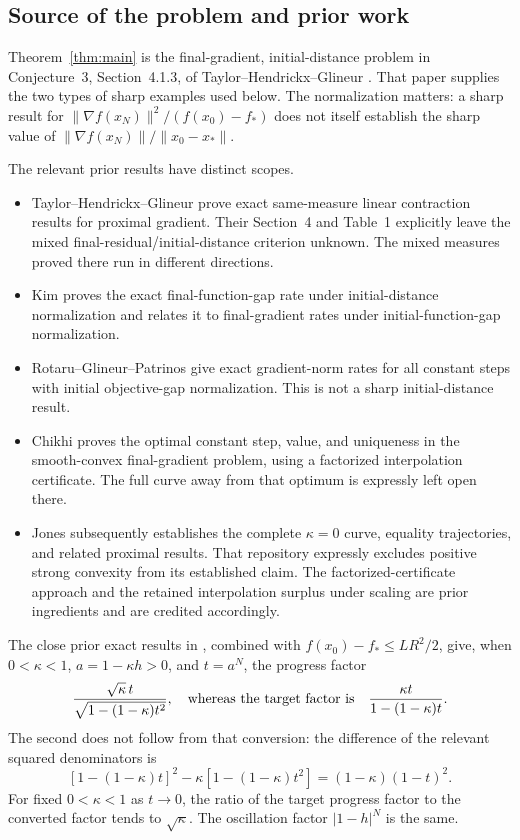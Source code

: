 \documentclass[11pt]{article}
\numberwithin{equation}{section}
\theoremstyle{remark}
\newcommand{\norm}[1]{\lVert #1\rVert}
\newcommand{\grad}{\nabla}
\begin{document}
\subsection{Source of the problem and prior work}\label{sec:source}

Theorem~\ref{thm:main} is the final-gradient, initial-distance problem
in Conjecture~3, Section~4.1.3, of Taylor--Hendrickx--Glineur
\cite{THG17}. That paper supplies the two types of sharp examples
used below. The normalization matters: a sharp result for
$\norm{\grad f(x_N)}^2/(f(x_0)-f_*)$ does not itself establish the
sharp value of $\norm{\grad f(x_N)}/\norm{x_0-x_*}$.

The relevant prior results have distinct scopes.
\begin{itemize}[leftmargin=*,itemsep=4pt]
\item Taylor--Hendrickx--Glineur \cite{THG18} prove exact same-measure
linear contraction results for proximal gradient. Their Section~4
and Table~1 explicitly leave the mixed final-residual/initial-distance
criterion unknown. The mixed measures proved there run in different
directions.
\item Kim \cite{Kim25} proves the exact final-function-gap rate under
initial-distance normalization and relates it to final-gradient
rates under initial-function-gap normalization.
\item Rotaru--Glineur--Patrinos \cite{RGP26} give exact gradient-norm
rates for all constant steps with initial objective-gap normalization.
This is not a sharp initial-distance result.
\item Chikhi \cite{Chikhi26} proves the optimal constant step, value,
and uniqueness in the smooth-convex final-gradient problem, using a
factorized interpolation certificate. The full curve away from
that optimum is expressly left open there.
\item Jones \cite{Jones26} subsequently establishes the complete
$\kappa=0$ curve, equality trajectories, and related proximal results.
That repository expressly excludes positive strong convexity
from its established claim. The factorized-certificate approach and
the retained interpolation surplus under scaling are prior ingredients
and are credited accordingly.
\end{itemize}

The close prior exact results in \cite{RGP26,Kim25}, combined with
$f(x_0)-f_*\leq LR^2/2$, give, when $0<\kappa<1$,
$a=1-\kappa h>0$, and $t=a^N$,
the progress factor
\begin{equation}
\frac{\sqrt{\kappa}\,t}{\sqrt{1-(1-\kappa)t^2}},
\quad\hbox{whereas the target factor is}\quad
\frac{\kappa t}{1-(1-\kappa)t}.
\label{eq:prior-comparison}
\end{equation}
The second does not follow from that conversion: the difference of
the relevant squared denominators is
\[
[1-(1-\kappa)t]^2-\kappa[1-(1-\kappa)t^2]
=(1-\kappa)(1-t)^2.
\]
For fixed $0<\kappa<1$ as $t\to0$, the ratio of the target progress
factor to the converted factor tends to $\sqrt{\kappa}$.
The oscillation factor $|1-h|^N$ is the same.
\end{document}
